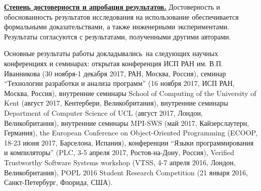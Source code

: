     
    

{\textbf{\underline{Степень достоверности и апробация результатов.}}}
Достоверность и обоснованность результатов исследования  на использование
обеспечивается формальными доказательствами, а также инженерными экспериментами.
Результаты согласуются с результатами, полученными другими авторами.

Основные результаты работы докладывались~на следующих научных конференциях и семинарах:
открытая конференция ИСП РАН им. В.П. Иванникова (30 ноября-1 декабря  2017, РАН, Москва, Россия),
семинар ``Технологии разработки и анализа программ'' (16 ноября 2017, ИСП РАН, Москва, Россия),
внутренние семинары School of Computing of the University of Kent (август 2017, Кентербери, Великобритания),
внутренние семинары Department of Computer Science of UCL (август 2017, Лондон, Великобритания),
внутренние семинары MPI-SWS (май 2017, Кайзерслаутерн, Германия),
the European Conference on Object-Oriented Programming (ECOOP, 18-23 июня 2017, Барселона, Испания),
конференции ``Языки программирования и компиляторы'' (PLC, 3-5 апреля 2017, Ростов-на-Дону, Россия),
Verified Trustworthy Software Systems workshop (VTSS, 4-7 апреля 2016, Лондон, Великобритания),
POPL 2016 Student Research Competition (21 января 2016, Санкт-Петербург, Флорида, США).



